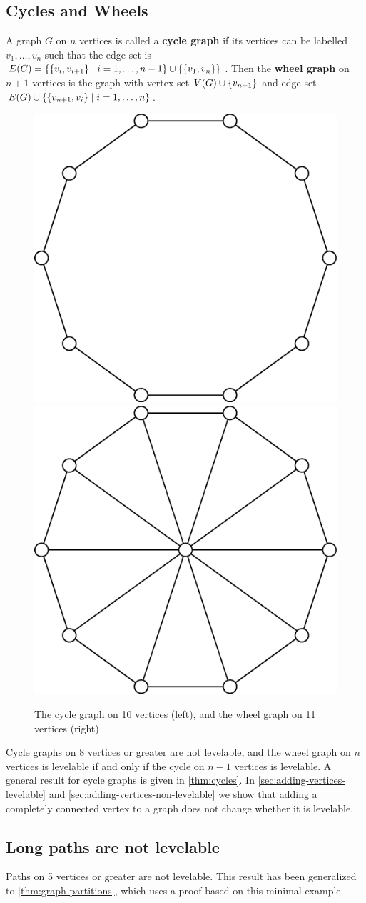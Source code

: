 \subsection{Cycles and Wheels} \label{subsec:cycles-wheels}
\begin{definition}
A graph $G$ on $n$ vertices is called a \textbf{cycle graph} if its vertices can be labelled  $v_1, \dots, v_n$ such that the edge set is $E(G) = \{ \{ v_i, v_{i+1} \} \; | \; i=1, \dots, n-1 \} \cup \{ \{ v_1, v_n \} \}$. Then the \textbf{wheel graph} on $n+1$ vertices is the graph with vertex set $V(G) \cup \{ v_{n+1} \}$ and edge set $E(G) \cup \{ \{ v_{n+1}, v_i \} \; | \; i = 1, \dots, n \}$. 
\end{definition}
\begin{figure}[bth]
    \myfloatalign
    \subfloat
    {\includegraphics[width=.33\linewidth]{figures/cycle.png}} \qquad 
    \subfloat
    {\includegraphics[width=.33\linewidth]{figures/wheel.png}} 
    \caption{The cycle graph on 10 vertices (left), and the wheel graph on 11 vertices (right)}
\end{figure}
Cycle graphs on 8 vertices or greater are not levelable, and the wheel graph on $n$ vertices is levelable if and only if the cycle on $n-1$ vertices is levelable. A general result for cycle graphs is given in \autoref{thm:cycles}. In \autoref{sec:adding-vertices-levelable} and \autoref{sec:adding-vertices-non-levelable} we show that adding a completely connected vertex to a graph does not change whether it is levelable.

\subsection{Long paths are not levelable} \label{subsec:paths} Paths on 5 vertices or greater are not levelable. This result has been generalized to \autoref{thm:graph-partitions}, which uses a proof based on this minimal example.


